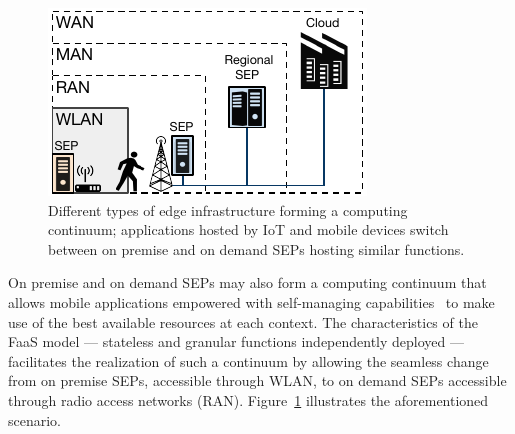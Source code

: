 \begin{figure}[tpb]
	\centering
	\includegraphics[width=1\linewidth]{Figs/Edge_Cloud_Continuum}
	\caption{Different types of edge infrastructure forming a computing continuum; applications hosted by IoT and mobile devices switch between on premise and on demand SEPs hosting similar functions.}
	\label{fig:Edge_Cloud_Continuum}
\end{figure}

On premise and on demand SEPs may also form a computing continuum that allows mobile applications empowered with self-managing capabilities~\cite{OrsiniBL16,Baresi:2018} to make use of the best available resources at each context. The characteristics of the FaaS model --- stateless and granular functions independently deployed --- facilitates the realization of such a continuum by allowing the seamless change from on premise SEPs, accessible through WLAN, to on demand SEPs accessible through radio access networks (RAN). Figure~\ref{fig:Edge_Cloud_Continuum} illustrates the aforementioned scenario. 












